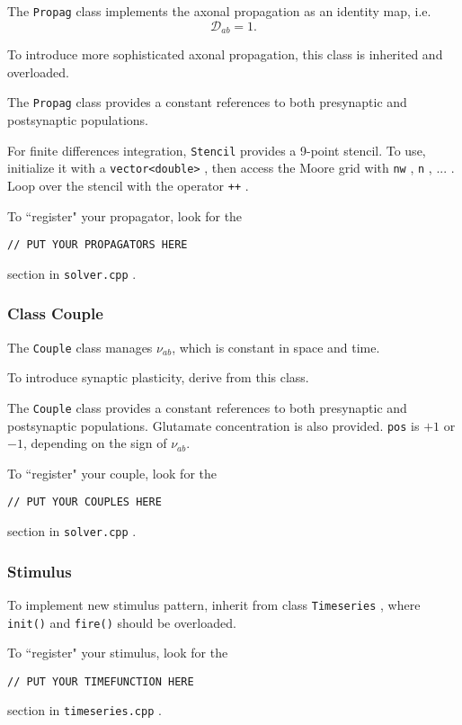\documentclass[12pt,a4paper]{article}
\newcommand{\type}[1]{ {\small\small\tt #1} }
\begin{document}
The \type{Propag} class implements the axonal propagation as an identity map, i.e.
\[ \mathcal{D}_{ab} = 1. \]

To introduce more sophisticated axonal propagation, this class is inherited and overloaded.

The \type{Propag} class provides a constant references to both presynaptic and postsynaptic populations.

For finite differences integration, \type{Stencil} provides a 9-point stencil. To use, initialize it with a \type{vector<double>}, then access the Moore grid with \type{nw}, \type{n}, ... . Loop over the stencil with the operator \type{++}.

To ``register" your propagator, look for the
\begin{lstlisting}
// PUT YOUR PROPAGATORS HERE
\end{lstlisting}
section in \type{solver.cpp}.

\subsubsection{Class Couple}
\label{sec:newcouple}

The \type{Couple} class manages \(\nu_{ab}\), which is constant in space and time.

To introduce synaptic plasticity, derive from this class.

The \type{Couple} class provides a constant references to both presynaptic and postsynaptic populations. Glutamate concentration is also provided. \type{pos} is $+1$ or $-1$, depending on the sign of \(\nu_{ab}\).

To ``register" your couple, look for the
\begin{lstlisting}
// PUT YOUR COUPLES HERE
\end{lstlisting}
section in \type{solver.cpp}.

\subsubsection{Stimulus}

To implement new stimulus pattern, inherit from class \type{Timeseries}, where \type{init()} and \type{fire()} should be overloaded.

To ``register" your stimulus, look for the
\begin{lstlisting}
// PUT YOUR TIMEFUNCTION HERE
\end{lstlisting}
section in \type{timeseries.cpp}.
\end{document}
